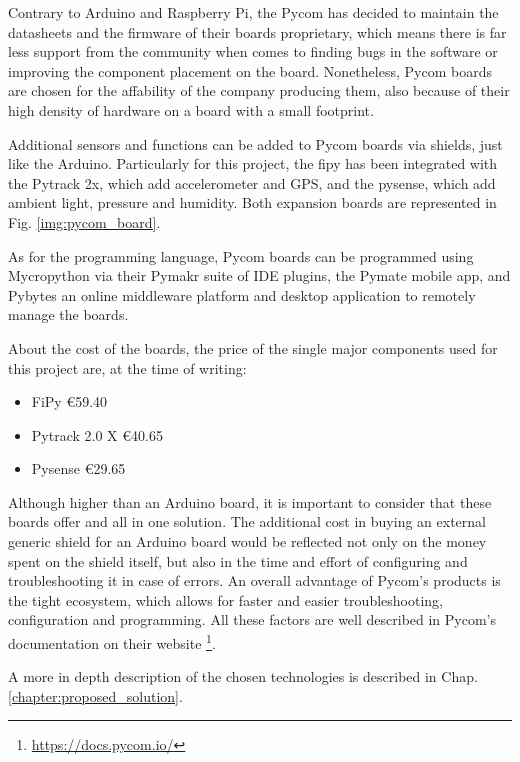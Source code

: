 			Contrary to Arduino and Raspberry Pi, the Pycom has decided to maintain the datasheets and the firmware of their boards proprietary, which means there is far less support from the community when comes to finding bugs in the software or improving the component placement on the board.
			Nonetheless, Pycom boards are chosen for the affability of the company producing them, also because of their high density of hardware on a board with a small footprint.
			
			Additional sensors and functions can be added to Pycom boards via shields, just like the Arduino.
			Particularly for this project, the fipy has been integrated with the Pytrack 2x, which add accelerometer and GPS, and the pysense, which add ambient light, pressure and humidity.
			Both expansion boards are represented in Fig. \ref{img:pycom_board}.
					
			As for the programming language, Pycom boards can be programmed using Mycropython via their Pymakr suite of IDE plugins, the Pymate mobile app, and Pybytes an online middleware platform and desktop application to remotely manage the boards.
			
			About the cost of the boards, the price of the single major components used for this project are, at the time of writing:
			\begin{itemize}[noitemsep]
				\item FiPy €59.40
				\item Pytrack 2.0 X €40.65
				\item Pysense €29.65
			\end{itemize}
			
			Although higher than an Arduino board, it is important to consider that these boards offer and all in one solution.
			The additional cost in buying an external generic shield for an Arduino board would be reflected not only on the money spent on the shield itself, but also in the time and effort of configuring and troubleshooting it in case of errors.
			An overall advantage of Pycom's products is the tight ecosystem, which allows for faster and easier troubleshooting, configuration and programming.
			All these factors are well described in Pycom's documentation on their website \footnote{\url{https://docs.pycom.io/}}.
			
			A more in depth description of the chosen technologies is described in Chap. \ref{chapter:proposed_solution}.